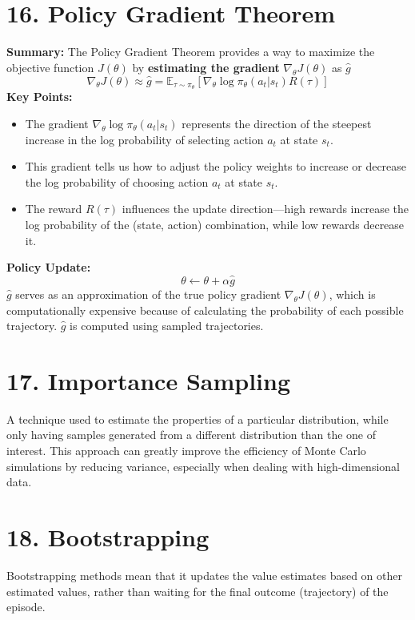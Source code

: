\documentclass[a4paper,10pt]{article}
\begin{document}
\begin{multicols}{2}
\section*{16. Policy Gradient Theorem}
\textbf{Summary:} The Policy Gradient Theorem provides a way to maximize the objective function \( J(\theta) \) by \textbf{estimating the gradient} \( \nabla_\theta J(\theta) \) as \( \hat{g} \)
\[
\nabla_\theta J(\theta) \approx \hat{g} = \mathbb{E}_{\tau \sim \pi_\theta} \left[ \nabla_\theta \log \pi_\theta(a_t | s_t) R(\tau) \right]
\]
\textbf{Key Points:}
\begin{itemize}
    \item The gradient \( \nabla_\theta \log \pi_\theta(a_t | s_t) \) represents the direction of the steepest increase in the log probability of selecting action \( a_t \) at state \( s_t \).
    \item This gradient tells us how to adjust the policy weights to increase or decrease the log probability of choosing action \( a_t \) at state \( s_t \).
    \item The reward \( R(\tau) \) influences the update direction—high rewards increase the log probability of the (state, action) combination, while low rewards decrease it.
\end{itemize}
\textbf{Policy Update:}
\[
\theta \leftarrow \theta + \alpha \hat{g}
\]
\( \hat{g} \) serves as an approximation of the true policy gradient \( \nabla_\theta J(\theta) \), which is computationally expensive because of calculating the probability of each possible trajectory. \( \hat{g} \) is computed using sampled trajectories.

\section*{17. Importance Sampling}
A technique used to estimate the properties of a particular distribution, while only having samples generated from a different distribution than the one of interest. This approach can greatly improve the efficiency of Monte Carlo simulations by reducing variance, especially when dealing with high-dimensional data.

\section*{18. Bootstrapping}
Bootstrapping methods mean that it updates the value estimates based on other estimated values, rather than waiting for the final outcome (trajectory) of the episode.

\end{multicols}
\end{document}
